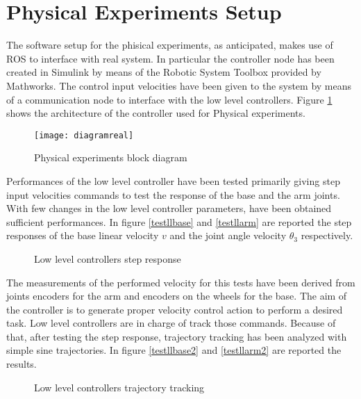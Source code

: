 \section{Physical Experiments Setup}
	The software setup for the phisical experiments, as anticipated, makes use of ROS to interface with real system. In particular the controller node has been created in Simulink by means of the Robotic System Toolbox provided by Mathworks. The control input velocities have been given to the system by means of a communication node to interface with the low level controllers. Figure \ref{diagramreal} shows the architecture of the controller used for Physical experiments.
	\begin{figure}[h!]
	\begin{center} 
		\texttt{[image: diagramreal]}
		\centering
		\label{diagramreal}
		\caption{Physical experiments block diagram} 
	\end{center}
	\end{figure}
	Performances of the low level controller have been tested primarily giving step input velocities commands to test the response of the base and the arm joints. With few changes in the low level controller parameters, have been obtained sufficient performances. In figure \ref{testllbase} and \ref{testllarm} are reported the step responses of the base linear velocity $v$ and the joint angle velocity $\theta_3$ respectively.
	\begin{figure}[ht]
	\centering
	\qquad
	\caption{Low level controllers step response}
	\end{figure}
	The measurements of the performed velocity for this tests have been derived from joints encoders for the arm and encoders on the wheels for the base. The aim of the controller is to generate proper velocity control action to perform a desired task. Low level controllers are in charge of track those commands. Because of that, after testing the step response, trajectory tracking has been analyzed with simple sine trajectories. In figure \ref{testllbase2} and \ref{testllarm2} are reported the results.
	\begin{figure}[ht]
	\centering
	\qquad
	\qquad
	\qquad
	\caption{Low level controllers trajectory tracking}
	\end{figure} \\
